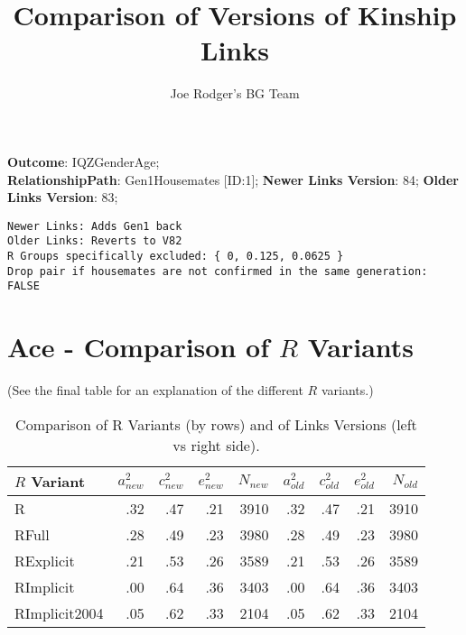 \documentclass{article}\usepackage[]{graphicx}\usepackage[]{color}
\title{Comparison of Versions of Kinship Links}
\author{Joe Rodger's BG Team}
\makeatletter
\newenvironment{kframe}{%
 \def\at@end@of@kframe{}%
 \ifinner\ifhmode%
  \def\at@end@of@kframe{\end{minipage}}%
  \begin{minipage}{\columnwidth}%
 \fi\fi%
 \def\FrameCommand##1{\hskip\@totalleftmargin \hskip-\fboxsep
 \colorbox{shadecolor}{##1}\hskip-\fboxsep
     \hskip-\linewidth \hskip-\@totalleftmargin \hskip\columnwidth}%
 \MakeFramed {\advance\hsize-\width
   \@totalleftmargin\z@ \linewidth\hsize
   \@setminipage}}%
 {\par\unskip\endMakeFramed%
 \at@end@of@kframe}
\newenvironment{knitrout}{}{} %
\makeatother
\begin{document}
\maketitle
\setcounter{totalnumber}{8} %

\setlength{\parindent}{0pt}%











\textbf{Outcome}: IQZGenderAge;\\
\textbf{RelationshipPath}: Gen1Housemates [ID:1];
\textbf{Newer Links Version}: 84;
\textbf{Older Links Version}: 83;

\begin{knitrout}
\color{fgcolor}\begin{kframe}
\begin{verbatim}
Newer Links: Adds Gen1 back
Older Links: Reverts to V82
R Groups specifically excluded: { 0, 0.125, 0.0625 }
Drop pair if housemates are not confirmed in the same generation: FALSE
\end{verbatim}
\end{kframe}
\end{knitrout}





\section{Ace - Comparison of $R$ Variants} 
(See the final table for an explanation of the different $R$ variants.)
\begin{table}[ht]
\centering
{\large
\begin{tabular}{l|rrrr|rrrr}
  \hline
$R$ Variant & $a_{new}^2$ & $c_{new}^2$ & $e_{new}^2$ & $N_{new}$ & $a_{old}^2$ & $c_{old}^2$ & $e_{old}^2$ & $N_{old}$ \\ 
  \hline
R & .32 & .47 & .21 & 3910 & .32 & .47 & .21 & 3910 \\ 
  RFull & .28 & .49 & .23 & 3980 & .28 & .49 & .23 & 3980 \\ 
  RExplicit & .21 & .53 & .26 & 3589 & .21 & .53 & .26 & 3589 \\ 
  RImplicit & .00 & .64 & .36 & 3403 & .00 & .64 & .36 & 3403 \\ 
  RImplicit2004 & .05 & .62 & .33 & 2104 & .05 & .62 & .33 & 2104 \\ 
   \hline
\end{tabular}
}
\caption{Comparison of R Variants (by rows) and of Links Versions (left vs right side).} 
\end{table}
\end{document}
